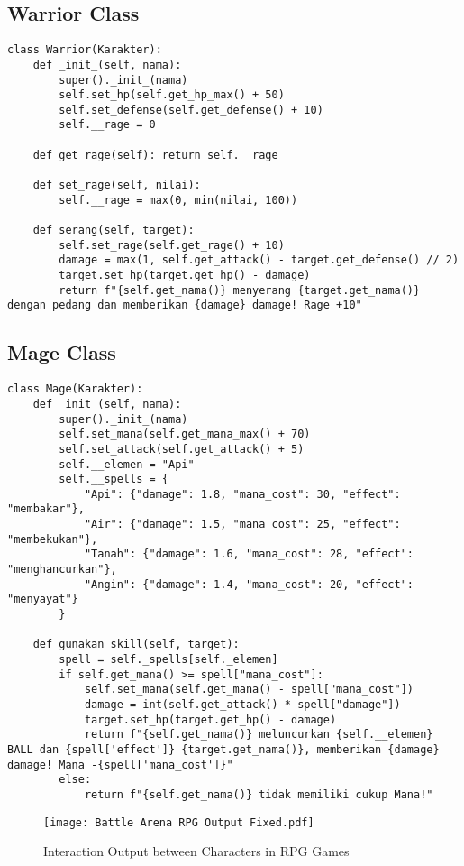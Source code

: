 \documentclass[12pt]{article}
\begin{document}
\subsection*{Warrior Class}
\begin{verbatim}
class Warrior(Karakter):
    def _init_(self, nama):
        super()._init_(nama)
        self.set_hp(self.get_hp_max() + 50)
        self.set_defense(self.get_defense() + 10)
        self.__rage = 0

    def get_rage(self): return self.__rage

    def set_rage(self, nilai):
        self.__rage = max(0, min(nilai, 100))

    def serang(self, target):
        self.set_rage(self.get_rage() + 10)
        damage = max(1, self.get_attack() - target.get_defense() // 2)
        target.set_hp(target.get_hp() - damage)
        return f"{self.get_nama()} menyerang {target.get_nama()} dengan pedang dan memberikan {damage} damage! Rage +10"
\end{verbatim}

\subsection*{Mage Class}
\begin{verbatim}
class Mage(Karakter):
    def _init_(self, nama):
        super()._init_(nama)
        self.set_mana(self.get_mana_max() + 70)
        self.set_attack(self.get_attack() + 5)
        self.__elemen = "Api"
        self.__spells = {
            "Api": {"damage": 1.8, "mana_cost": 30, "effect": "membakar"},
            "Air": {"damage": 1.5, "mana_cost": 25, "effect": "membekukan"},
            "Tanah": {"damage": 1.6, "mana_cost": 28, "effect": "menghancurkan"},
            "Angin": {"damage": 1.4, "mana_cost": 20, "effect": "menyayat"}
        }

    def gunakan_skill(self, target):
        spell = self._spells[self._elemen]
        if self.get_mana() >= spell["mana_cost"]:
            self.set_mana(self.get_mana() - spell["mana_cost"])
            damage = int(self.get_attack() * spell["damage"])
            target.set_hp(target.get_hp() - damage)
            return f"{self.get_nama()} meluncurkan {self.__elemen} BALL dan {spell['effect']} {target.get_nama()}, memberikan {damage} damage! Mana -{spell['mana_cost']}"
        else:
            return f"{self.get_nama()} tidak memiliki cukup Mana!"
\end{verbatim}

\begin{figure}[h!]
    \centering
    \vspace*{2cm}
    \hspace*{-3.5cm}
    \texttt{[image: Battle Arena RPG Output Fixed.pdf]}
    \vspace*{2cm}
    \caption{Interaction Output between Characters in RPG Games}
    \label{fig:output}
\end{figure}
\end{document}
